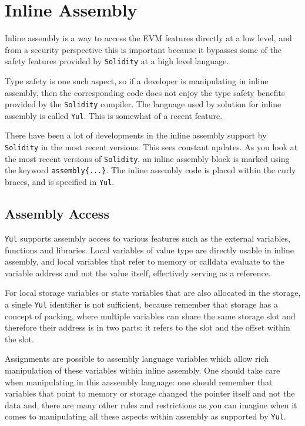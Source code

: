 \section{Inline Assembly}\label{inline-assembly}

Inline assembly is a way to access the EVM features directly at a low
level, and from a security perspective this is important because it
bypasses some of the safety features provided by \texttt{Solidity} at a
high level language.

Type safety is one such aspect, so if a developer is manipulating in
inline assembly, then the corresponding code does not enjoy the type
safety benefits provided by the \texttt{Solidity} compiler. The language
used by solution for inline assembly is called \texttt{Yul}. This is
somewhat of a recent feature.

There have been a lot of developments in the inline assembly support by
\texttt{Solidity} in the most recent versions. This sees constant
updates. As you look at the most recent versions of \texttt{Solidity},
an inline assembly block is marked using the keyword
\texttt{assembly\{...\}}. The inline assembly code is placed within the
curly braces, and is specified in \texttt{Yul}.

\subsection{Assembly Access}\label{assembly-access}

\texttt{Yul} supports assembly access to various features such as the
external variables, functions and libraries. Local variables of value
type are directly usable in inline assembly, and local variables that
refer to memory or calldata evaluate to the variable address and not the
value itself, effectively serving as a reference.

For local storage variables or state variables that are also allocated
in the storage, a single \texttt{Yul} identifier is not sufficient,
because remember that storage has a concept of packing, where multiple
variables can share the same storage slot and therefore their address is
in two parts: it refers to the slot and the offset within the slot.

Assignments are possible to assembly language variables which allow rich
manipulation of these variables within inline assembly. One should take
care when manipulating in this aassembly language: one should remember
that variables that point to memory or storage changed the pointer
itself and not the data and, there are many other rules and restrictions
as you can imagine when it comes to manipulating all these aspects
within assembly as supported by \texttt{Yul}.

